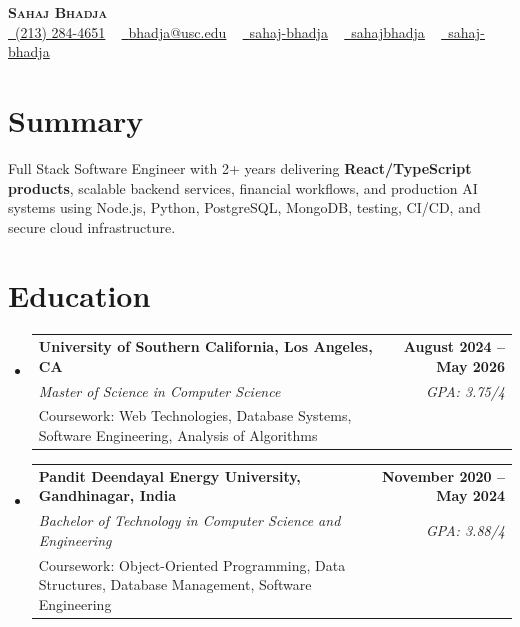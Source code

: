 \documentclass[letterpaper,10pt]{article}
\makeatletter
\newcommand{\sectionGap}{\vspace{-8pt}}
\newcommand{\resumeEduSubheading}[5]{\vspace{-1pt}\item\begin{tabular*}{1.0\textwidth}[t]{l@{\extracolsep{\fill}}r}\textbf{#1} & \textbf{\small #2} \\\textit{\small #3} & \textit{\small #4} \\\small #5 & \\\end{tabular*}\vspace{-4pt}}
\newcommand{\resumeSubHeadingListStart}{\begin{itemize}[leftmargin=0.0in, label={}]}
\newcommand{\resumeSubHeadingListEnd}{\end{itemize}}
\makeatother
\begin{document}
\begin{center}
{\Huge \scshape \textbf{Sahaj Bhadja}} \\ \vspace{1pt}
\small \href{tel:2132844651}{\faPhone\ \underline{(213) 284-4651}} ~ \href{mailto:bhadja@usc.edu}{\raisebox{-0.2\height}\faEnvelope\ \underline{bhadja@usc.edu}} ~
\href{https://www.linkedin.com/in/sahaj-bhadja/}{\raisebox{-0.2\height}\faLinkedin\ \underline{sahaj-bhadja}} ~ \href{https://github.com/SAHAJ-BHADJA}{\raisebox{-0.2\height}\faGithub\ \underline{sahajbhadja}} ~
\href{https://sahaj-bhadja.vercel.app/}{\raisebox{-0.2\height}\faGlobe\ \underline{sahaj-bhadja}}
\end{center}
\vspace{-16pt}
\section{Summary}
\begin{itemize}[leftmargin=0.15in, label={}]
\small{\item{Full Stack Software Engineer with 2+ years delivering \textbf{React/TypeScript products}, scalable backend services, financial workflows, and production AI systems using Node.js, Python, PostgreSQL, MongoDB, testing, CI/CD, and secure cloud infrastructure.}}
\end{itemize}
\sectionGap
\section{Education}
\resumeSubHeadingListStart
\resumeEduSubheading{University of Southern California, Los Angeles, CA}{August 2024 -- May 2026}{Master of Science in Computer Science}{GPA: 3.75/4}{Coursework: Web Technologies, Database Systems, Software Engineering, Analysis of Algorithms}
\resumeEduSubheading{Pandit Deendayal Energy University, Gandhinagar, India}{November 2020 -- May 2024}{Bachelor of Technology in Computer Science and Engineering}{GPA: 3.88/4}{Coursework: Object-Oriented Programming, Data Structures, Database Management, Software Engineering}
\resumeSubHeadingListEnd
\sectionGap
\end{document}
